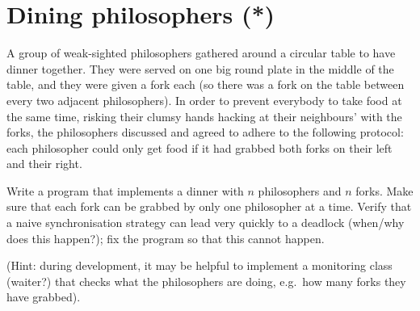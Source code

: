 \documentclass{article}
\begin{document}
\section{Dining philosophers (*)}
\label{sec:dining-philosophers}

A group of weak-sighted philosophers gathered around a circular table
to have dinner together. They were served on one big round plate in
the middle of the table, and they were given a fork each (so there was
a fork on the table between every two adjacent philosophers). In order to
prevent everybody to take food at the same time, risking their clumsy
hands hacking at their neighbours' with the forks, 
the philosophers discussed and agreed to adhere to the following
protocol: each philosopher could only get food if it had grabbed both
forks on their left and their right. 

Write a program that implements a dinner with $n$ philosophers and $n$
forks. Make sure that each fork can be grabbed by only one philosopher
at a time. Verify that a naive synchronisation strategy can lead very
quickly to a deadlock (when/why does this happen?); 
fix the program so that this cannot happen. 

(Hint: during development, it may be helpful to implement a monitoring
class (waiter?)  that checks what the philosophers are doing, e.g.~how
many forks they have grabbed).
\end{document}
